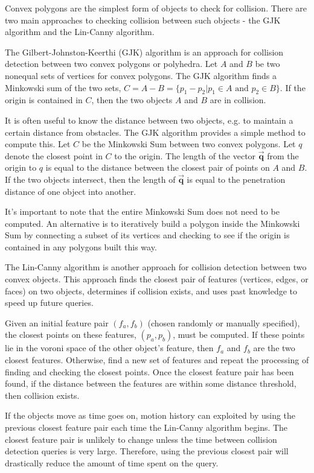 \documentclass[10pt,conference]{ieeeconf}
\begin{document}
	Convex polygons are the simplest form of objects to check for collision. There are two main approaches to checking collision between such objects - the GJK algorithm and the Lin-Canny algorithm.
	
	The Gilbert-Johnston-Keerthi (GJK) algorithm \cite{gilbert1988fast} is an approach for collision detection between two convex polygons or polyhedra. Let $A$ and $B$ be two nonequal sets of vertices for convex polygons. The GJK algorithm finds a Minkowski sum of the two sets, $C = A - B = \{p_1 - p_2 | p_1 \in A \text{ and } p_2 \in B\}$. If the origin is contained in $C$, then the two objects $A$ and $B$ are in collision.
	
	It is often useful to know the distance between two objects, e.g. to maintain a certain distance from obstacles. The GJK algorithm provides a simple method to compute this. Let $C$ be the Minkowski Sum between two convex polygons. Let $q$ denote the closest point in $C$ to the origin. The length of the vector $\vec{\textbf{q}}$ from the origin to $q$ is equal to the distance between the closest pair of points on $A$ and $B$. If the two objects intersect, then the length of $\vec{\textbf{q}}$ is equal to the penetration distance of one object into another.
	
	It's important to note that the entire Minkowski Sum does not need to be computed. An alternative is to iteratively build a polygon inside the Minkowski Sum by connecting a subset of its vertices and checking to see if the origin is contained in any polygons built this way. 
	
	The Lin-Canny algorithm \cite{lin1991fast} is another approach for collision detection between two convex objects. This approach finds the closest pair of features (vertices, edges, or faces) on two objects, determines if collision exists, and uses past knowledge to speed up future queries. 
	
	Given an initial feature pair $(f_a, f_b)$ (chosen randomly or manually specified), the closest points on these features, $(p_a, p_b)$, must be computed. If these points lie in the voroni space of the other object's feature, then $f_a$ and $f_b$ are the two closest features. Otherwise, find a new set of features and repeat the processing of finding and checking the closest points. Once the closest feature pair has been found, if the distance between the features are within some distance threshold, then collision exists.
	
	If the objects move as time goes on, motion history can exploited by using the previous closest feature pair each time the Lin-Canny algorithm begins. The closest feature pair is unlikely to change unless the time between collision detection queries is very large. Therefore, using the previous closest pair will drastically reduce the amount of time spent on the query. 
	
\end{document}
